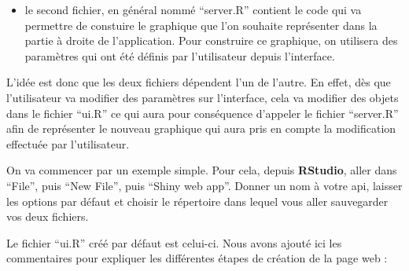 \documentclass[
]{book}
\providecommand{\tightlist}{%
  \setlength{\itemsep}{0pt}\setlength{\parskip}{0pt}}
\theoremstyle{definition}
\theoremstyle{definition}
\theoremstyle{definition}
\theoremstyle{definition}
\theoremstyle{remark}
\begin{document}
\begin{itemize}
\tightlist
\item
  le second fichier, en général nommé ``server.R'' contient le code qui va permettre de constuire le graphique que l'on souhaite représenter dans la partie à droite de l'application. Pour construire ce graphique, on utilisera des paramètres qui ont été définis par l'utilisateur depuis l'interface.
\end{itemize}

L'idée est donc que les deux fichiers dépendent l'un de l'autre. En effet, dès que l'utilisateur va modifier des paramètres sur l'interface, cela va modifier des objets dans le fichier ``ui.R'' ce qui aura pour conséquence d'appeler le fichier ``server.R'' afin de représenter le nouveau graphique qui aura pris en compte la modification effectuée par l'utilisateur.

On va commencer par un exemple simple. Pour cela, depuis \textbf{RStudio}, aller dans ``File'', puis ``New File'', puis ``Shiny web app''. Donner un nom à votre api, laisser les options par défaut et choisir le répertoire dans lequel vous aller sauvegarder vos deux fichiers.

Le fichier ``ui.R'' créé par défaut est celui-ci. Nous avons ajouté ici les commentaires pour expliquer les différentes étapes de création de la page web :
\end{document}
